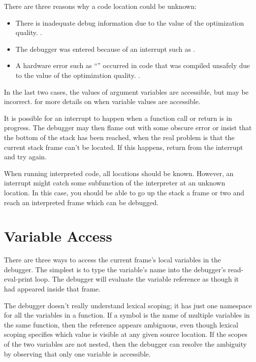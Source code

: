 There are three reasons why a code location could be unknown:
\begin{itemize}

\item
There is inadequate debug information due to the value of the 
optimization quality.  .

\item
The debugger was entered because of an interrupt such as .

\item
A hardware error such as ``'' occurred in code that was
compiled unsafely due to the value of the  optimization
quality.  .
\end{itemize}

In the last two cases, the values of argument variables are accessible,
but may be incorrect.   for more details on
when variable values are accessible.

It is possible for an interrupt to happen when a function call or return is in
progress.  The debugger may then flame out with some obscure error or insist
that the bottom of the stack has been reached, when the real problem is that
the current stack frame can't be located.  If this happens, return from the
interrupt and try again.

When running interpreted code, all locations should be known.  However,
an interrupt might catch some subfunction of the interpreter at an
unknown location.  In this case, you should be able to go up the stack a
frame or two and reach an interpreted frame which can be debugged.


\section{Variable Access}
\label{debug-vars}

There are three ways to access the current frame's local variables in the
debugger.  The simplest is to type the variable's name into the debugger's
read-eval-print loop.  The debugger will evaluate the variable reference as
though it had appeared inside that frame.

The debugger doesn't really understand lexical scoping; it has just one
namespace for all the variables in a function.  If a symbol is the name of
multiple variables in the same function, then the reference appears ambiguous,
even though lexical scoping specifies which value is visible at any given
source location.  If the scopes of the two variables are not nested, then the
debugger can resolve the ambiguity by observing that only one variable is
accessible.

